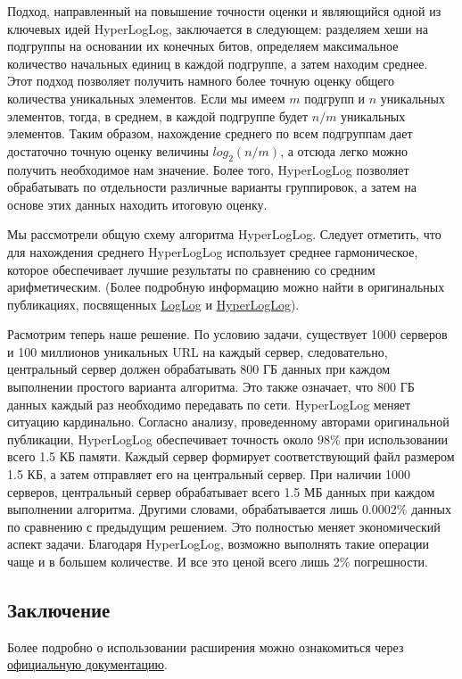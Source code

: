 Подход, направленный на повышение точности оценки и являющийся одной из ключевых идей HyperLogLog, заключается в следующем: разделяем хеши на подгруппы на основании их конечных битов, определяем максимальное количество начальных единиц в каждой подгруппе, а затем находим среднее. Этот подход позволяет получить намного более точную оценку общего количества уникальных элементов. Если мы имеем $m$ подгрупп и $n$ уникальных элементов, тогда, в среднем, в каждой подгруппе будет $n/m$ уникальных элементов. Таким образом, нахождение среднего по всем подгруппам дает достаточно точную оценку величины $log_2{(n/m)}$, а отсюда легко можно получить необходимое нам значение. Более того, HyperLogLog позволяет обрабатывать по отдельности различные варианты группировок, а затем на основе этих данных находить итоговую оценку.

Мы рассмотрели общую схему алгоритма HyperLogLog. Следует отметить, что для нахождения среднего HyperLogLog использует среднее гармоническое, которое обеспечивает лучшие результаты по сравнению со средним арифметическим. (Более подробную информацию можно найти в оригинальных публикациях, посвященных \href{http://www.ic.unicamp.br/~celio/peer2peer/math/bitmap-algorithms/durand03loglog.pdf}{LogLog} и \href{http://algo.inria.fr/flajolet/Publications/FlFuGaMe07.pdf}{HyperLogLog}).

Расмотрим теперь наше решение. По условию задачи, существует 1000 серверов и 100 миллионов уникальных URL на каждый сервер, следовательно, центральный сервер должен обрабатывать 800 ГБ данных при каждом выполнении простого варианта алгоритма. Это также означает, что 800 ГБ данных каждый раз необходимо передавать по сети. HyperLogLog меняет ситуацию кардинально. Согласно анализу, проведенному авторами оригинальной публикации, HyperLogLog обеспечивает точность около 98\% при использовании всего 1.5 КБ памяти. Каждый сервер формирует соответствующий файл размером 1.5 КБ, а затем отправляет его на центральный сервер. При наличии 1000 серверов, центральный сервер обрабатывает всего 1.5 МБ данных при каждом выполнении алгоритма. Другими словами, обрабатывается лишь 0.0002\% данных по сравнению с предыдущим решением. Это полностью меняет экономический аспект задачи. Благодаря HyperLogLog, возможно выполнять такие операции чаще и в большем количестве. И все это ценой всего лишь 2\% погрешности.



\subsection{Заключение}

Более подробно о использовании расширения можно ознакомиться через \href{https://github.com/aggregateknowledge/postgresql-hll/blob/master/README.markdown}{официальную документацию}.
